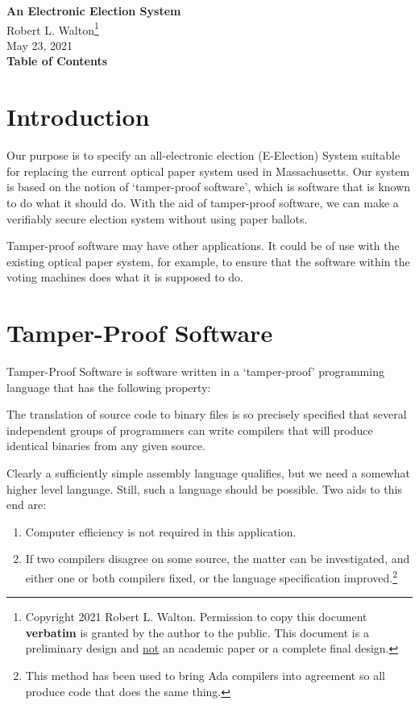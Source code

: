 \documentclass[12pt]{article}
\makeatletter
\renewcommand\tableofcontents{%
    \begin{list}{}%
	     {\setlength{\itemsep}{0in}%
	      \setlength{\topsep}{0in}%
	      \setlength{\parsep}{1ex}%
	      \setlength{\labelwidth}{0in}%
	      \setlength{\baselineskip}{1.5ex}%
	      \setlength{\leftmargin}{0.8in}%
	      \setlength{\rightmargin}{0.8in}}%
    \item\@starttoc{toc}%
    \end{list}}
\newenvironment{indpar}[1][0.3in]%
	{\begin{list}{}%
		     {\setlength{\itemsep}{0in}%
		      \setlength{\topsep}{0in}%
		      \setlength{\parsep}{1ex}%
		      \setlength{\labelwidth}{#1}%
		      \setlength{\leftmargin}{#1}%
		      \addtolength{\leftmargin}{\labelsep}}%
	 \item}%
	{\end{list}}
\makeatother
\begin{document}
        
\begin{center}
\Large
{\LARGE  \bf An Electronic Election System}
\\[2ex]
Robert L. Walton\footnote{Copyright 2021 Robert L. Walton.
Permission to copy this document {\bf verbatim} is granted by the author
to the public. This document is a preliminary design and
\underline{not} an academic paper or a complete final
design.}
\\[2ex]
May 23, 2021
\\[2ex]
{\bf Table of Contents}
\end{center}

\bigskip

\tableofcontents 

\newpage

\section{Introduction}

Our purpose is to specify an all-electronic election (E-Election) System
suitable for replacing the current optical paper system
used in Massachusetts.  Our system is based on the notion
of `tamper-proof software', which is software that is
known to do what it should do.  With the aid of tamper-proof
software, we can make a verifiably secure election system without
using paper ballots.

Tamper-proof software may have other applications.
It could be of use with the existing optical paper system,
for example, to ensure that the software within the voting
machines does what it is supposed to do.

\section{Tamper-Proof Software}

Tamper-Proof Software is software written in a `tamper-proof'
programming language
that has the following property:
\begin{indpar}
The translation of source code to binary files is so precisely
specified that several independent groups of programmers can
write compilers that will produce identical binaries from any
given source.
\end{indpar}

Clearly a sufficiently simple assembly language qualifies, but
we need a somewhat higher level language.  Still, such a language
should be possible.  Two aids to this end are:
\begin{enumerate}
\item
Computer efficiency is not required in this application.

\item
If two compilers disagree on some source, the matter can be
investigated, and either one or both compilers fixed, or the
language specification improved.\footnote{This method has been
used to bring Ada compilers into agreement so all produce
code that does the same thing.}
\end{enumerate}
\end{document}
